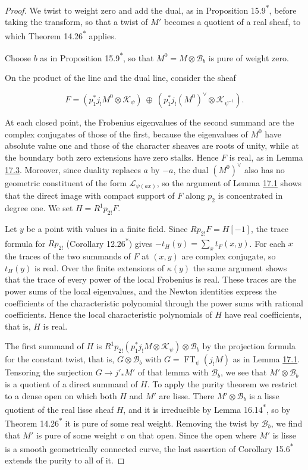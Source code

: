 \documentclass[11pt]{article}
\newcommand{\bpout}[1]{#1\textsuperscript{\hyperlink{bp-outside}{\ensuremath{\ast}}}}
\begin{document}
\begin{proof}[{Proof}]\label{bp13}%
We twist to weight zero and add the dual, as in Proposition \bpout{15.9}, before taking the transform, so that a twist of \(M'\) becomes a quotient of a real sheaf, to which Theorem \bpout{14.26} applies.

Choose \(b\) as in Proposition \bpout{15.9}, so that \(M^0=M\otimes\mathcal B_b\) is pure of weight zero.

On the product of the line and the dual line, consider the sheaf

\[
F=
(p_1^*j_!M^0\otimes\mathcal K_\psi)
\ \oplus\
(p_1^*j_!(M^0)^\vee\otimes\mathcal K_{\psi^{-1}}).
\]

At each closed point, the Frobenius eigenvalues of the second summand are the complex conjugates of those of the first, because the eigenvalues of \(M^0\) have absolute value one and those of the character sheaves are roots of unity, while at the boundary both zero extensions have zero stalks. Hence \(F\) is real, as in Lemma \hyperref[bp9]{17.3}. Moreover, since duality replaces \(a\) by \(-a\), the dual \((M^0)^\vee\) also has no geometric constituent of the form \(\mathcal L_{\psi(ax)}\), so the argument of Lemma \hyperref[bp5]{17.1} shows that the direct image with compact support of \(F\) along \(p_2\) is concentrated in degree one. We set \(H=R^1p_{2!}F\).

Let \(y\) be a point with values in a finite field. Since \(Rp_{2!}F=H[-1]\), the trace formula for \(Rp_{2!}\) (Corollary \bpout{12.26}) gives \(-t_H(y)=\sum_x t_F(x,y)\). For each \(x\) the traces of the two summands of \(F\) at \((x,y)\) are complex conjugate, so \(t_H(y)\) is real. Over the finite extensions of \(\kappa(y)\) the same argument shows that the trace of every power of the local Frobenius is real. These traces are the power sums of the local eigenvalues, and the Newton identities express the coefficients of the characteristic polynomial through the power sums with rational coefficients. Hence the local characteristic polynomials of \(H\) have real coefficients, that is, \(H\) is real.

The first summand of \(H\) is \(R^1p_{2!}(p_1^*j_!M\otimes\mathcal K_\psi)\otimes\mathcal B_b\) by the projection formula for the constant twist, that is, \(G\otimes\mathcal B_b\) with \(G=\operatorname{FT}_\psi(j_!M)\) as in Lemma \hyperref[bp5]{17.1}. Tensoring the surjection \(G\to j'_*M'\) of that lemma with \(\mathcal B_b\), we see that \(M'\otimes\mathcal B_b\) is a quotient of a direct summand of \(H\). To apply the purity theorem we restrict to a dense open on which both \(H\) and \(M'\) are lisse. There \(M'\otimes\mathcal B_b\) is a lisse quotient of the real lisse sheaf \(H\), and it is irreducible by Lemma \bpout{16.14}, so by Theorem \bpout{14.26} it is pure of some real weight. Removing the twist by \(\mathcal B_b\), we find that \(M'\) is pure of some weight \(v\) on that open. Since the open where \(M'\) is lisse is a smooth geometrically connected curve, the last assertion of Corollary \bpout{15.6} extends the purity to all of it.
\end{proof}
\end{document}
